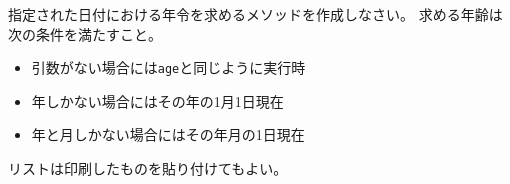 \begin{Prob}\upshape
 指定された日付における年令を求めるメソッドを作成しなさい。
 求める年齢は次の条件を満たすこと。
 \begin{itemize}
  \item 引数がない場合には\texttt{age}と同じように実行時
  \item 年しかない場合にはその年の1月1日現在
  \item 年と月しかない場合にはその年月の1日現在
 \end{itemize}
\end{Prob}
\ifText リストは印刷したものを貼り付けてもよい。\vspace{0.2\textheight}\fi
